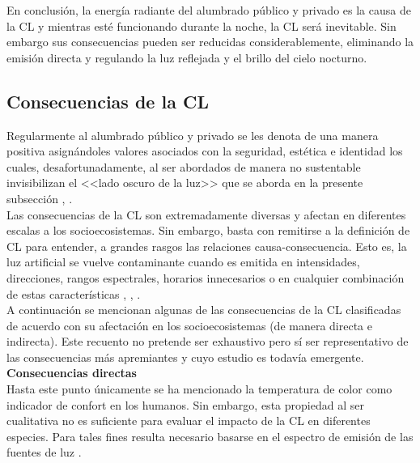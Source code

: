 En conclusión, la energía radiante del alumbrado público y privado es la causa de la CL y mientras esté funcionando durante la noche, la CL será inevitable. Sin embargo sus consecuencias pueden ser reducidas considerablemente, eliminando la emisión directa y regulando la luz reflejada y el brillo del cielo nocturno.\\ 

\subsection{Consecuencias de la CL}
\label{subsec:consecuenciascl}

Regularmente al alumbrado público y privado se les denota de una manera positiva asignándoles valores asociados con la seguridad, estética e identidad los cuales, desafortunadamente, al ser abordados de manera no sustentable invisibilizan el <<lado oscuro de la luz>> que se aborda en la presente subsección \citep{Globaldiscussion}, \citep{LibroCL}.\\ 

Las consecuencias de la CL son extremadamente diversas y afectan en diferentes escalas a los socioecosistemas. Sin embargo, basta con remitirse a la definición de CL para entender, a grandes rasgos las relaciones causa-consecuencia. Esto es, la luz artificial se vuelve contaminante cuando es emitida en intensidades, direcciones, rangos espectrales, horarios innecesarios o en cualquier combinación de estas características \citep{AtlasREPSA}, \citep{LibroCL}, \citep{Stone2017}.\\ 

A continuación se mencionan algunas de las consecuencias de la CL clasificadas de acuerdo con su afectación en los socioecosistemas (de manera directa e indirecta). Este recuento no pretende ser exhaustivo pero sí ser representativo de las consecuencias más apremiantes y cuyo estudio es todavía emergente.\\

\textbf{Consecuencias directas}\\ 

Hasta este punto únicamente se ha mencionado la temperatura de color como indicador de confort en los humanos. Sin embargo, esta propiedad al ser cualitativa no es suficiente para evaluar el impacto de la CL en diferentes especies. Para tales fines resulta necesario basarse en el espectro de emisión de las fuentes de luz \citep{CEI2017}.\\

\newpage


